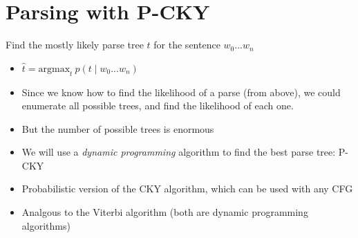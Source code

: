 \documentclass[11pt,letterpaper]{article}
\begin{document}
\section{Parsing with P-CKY}

Find the mostly likely parse tree $t$ for the sentence $w_0...w_n$
\begin{itemize}
  \item $ \hat{t} = \text{argmax}_t~p(t \mid w_0...w_n) $
  \item Since we know how to find the likelihood of a parse (from above), we could enumerate all possible trees, and find the likelihood of each one.
  \item But the number of possible trees is enormous
  \item We will use a \textit{dynamic programming} algorithm to find the best parse tree: P-CKY
  \item Probabilistic version of the CKY algorithm, which can be used with any CFG
  \item Analgous to the Viterbi algorithm (both are dynamic programming algorithms)
\end{itemize}
\end{document}
